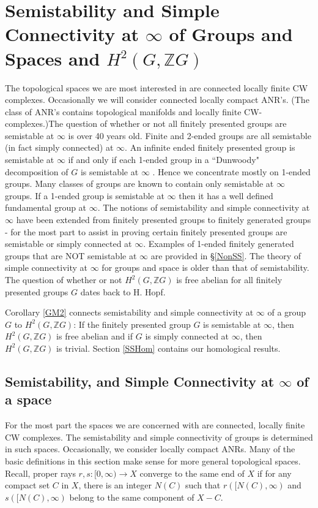 \documentclass[12pt]{article}
\begin{document}
\newpage
\section{Semistability and Simple Connectivity at $\infty$ of Groups and Spaces and $H^2(G,\mathbb ZG)$}\label{SSscH}

The topological spaces we are most interested in are connected locally finite CW complexes. Occasionally we will consider connected locally compact ANR's. (The class of ANR's contains topological manifolds and locally finite CW-complexes.)The question of whether or not all finitely presented groups are semistable at $\infty$ is over 40 years old. Finite and 2-ended groups are all semistable (in fact simply connected) at $\infty$. An infinite ended finitely presented group is semistable at $\infty$ if and only if each 1-ended group in a ``Dunwoody" decomposition of $G$ is semistable at $\infty$ \cite{M87}. Hence we concentrate mostly on 1-ended groups. Many classes of groups are known to contain only semistable at $\infty$ groups. If a 1-ended group is semistable at $\infty$ then it has a well defined fundamental group at $\infty$. The notions of  semistability and simple connectivity at $\infty$ have been extended from finitely presented groups to finitely generated groups - for the most part to assist in proving certain finitely presented groups are semistable or simply connected at $\infty$. Examples of 1-ended finitely generated groups that are NOT semistable at $\infty$ are provided in \S \ref{NonSS}. The theory of simple connectivity at $\infty$ for groups and space is older than that of semistability. The question of whether or not $H^2(G,\mathbb ZG)$ is free abelian for all finitely presented groups $G$ dates back to H. Hopf. 

Corollary \ref{GM2} connects semistability and simple connectivity at $\infty$ of a group $G$ to $H^2(G,\mathbb ZG)$: If the finitely presented group $G$ is semistable at $\infty$, then $H^2(G,\mathbb ZG)$ is free abelian and if $G$ is simply connected at $\infty$, then $H^2(G,\mathbb ZG)$ is trivial. Section \ref{SSHom} contains our homological results. 



\subsection{Semistability, and Simple Connectivity at $\infty$ of a space} \label{DefSSsp}
For the most part the spaces we are concerned with are connected, locally finite CW complexes.  The semistability and simple connectivity of groups is determined in such spaces. Occasionally, we consider locally compact ANRs. Many of the basic definitions in this section make sense for more general topological spaces. Recall, proper rays $r,s:[0,\infty)\to X$ converge to the same end of $X$ if for any compact set $C$ in $X$, there is an integer $N(C)$ such that $r([N(C),\infty)$ and $s([N(C),\infty)$ belong to the same component of $X-C$. 
\end{document}
